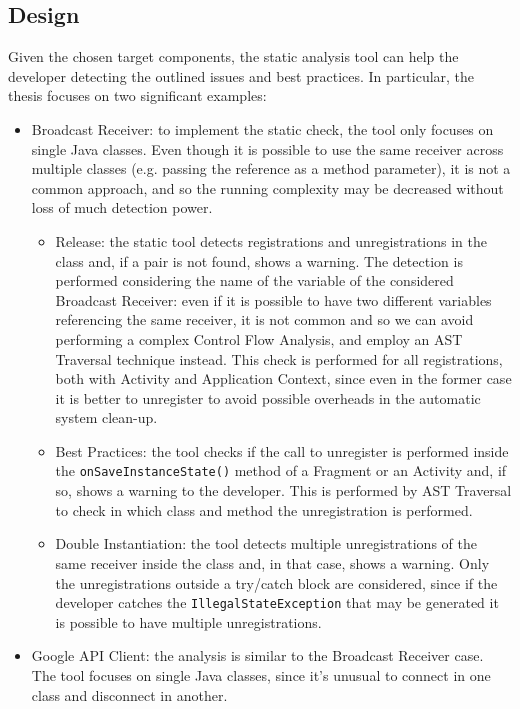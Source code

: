\documentclass[11pt,a4paper,notitlepage]{article}
\begin{document}
\subsection{Design}
Given the chosen target components, the static analysis tool can help the developer detecting the outlined issues and best practices. In particular, the thesis focuses on two significant examples:
\begin{itemize}
	\item Broadcast Receiver: to implement the static check, the tool only focuses on single Java classes. Even though it is possible to use the same receiver across multiple classes (e.g. passing the reference as a method parameter), it is not a common approach, and so the running complexity may be decreased without loss of much detection power.
	\begin{itemize}
		\item Release: the static tool detects registrations and unregistrations in the class and, if a pair is not found, shows a warning. The detection is performed considering the name of the variable of the considered Broadcast Receiver: even if it is possible to have two different variables referencing the same receiver, it is not common and so we can avoid performing a complex Control Flow Analysis, and employ an AST Traversal technique instead. This check is performed for all registrations, both with Activity and Application Context, since even in the former case it is better to unregister to avoid possible overheads in the automatic system clean-up.
		\item Best Practices: the tool checks if the call to unregister is performed inside the \texttt{onSaveInstanceState()} method of a Fragment or an Activity and, if so, shows a warning to the developer. This is performed by AST Traversal to check in which class and method the unregistration is performed.
		\item Double Instantiation: the tool detects multiple unregistrations of the same receiver inside the class and, in that case, shows a warning. Only the unregistrations outside a try/catch block are considered, since if the developer catches the \texttt{IllegalStateException} that may be generated it is possible to have multiple unregistrations.
	\end{itemize}
	\item Google API Client: the analysis is similar to the Broadcast Receiver case. The tool focuses on single Java classes, since it's unusual to connect in one class and disconnect in another.

\end{itemize}
\end{document}
